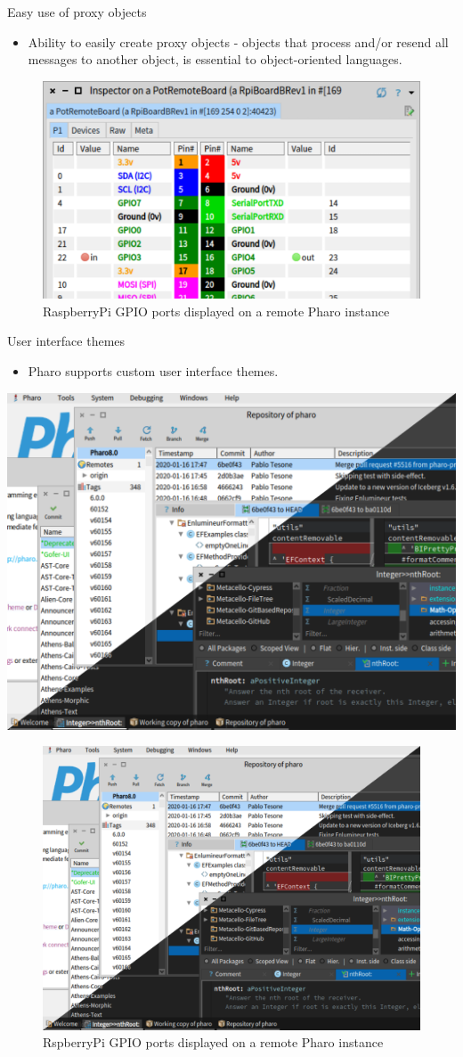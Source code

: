 \documentclass{beamer}
\begin{document}
\begin{frame}{Easy use of proxy objects}
\begin{itemize}
    \item Ability to easily create proxy objects - objects that process and/or resend all messages to another object, is essential to object-oriented languages.
\end{itemize}
\begin{figure}
    \centering
    \includegraphics[width=0.5\linewidth]{iot.png}
    \caption{RaspberryPi GPIO ports displayed on a remote Pharo instance }
    \label{fig:iot}
\end{figure}
\end{frame}

\begin{frame}{User interface themes}
\begin{itemize}
    \item Pharo supports custom user interface themes.
\end{itemize}
\includegraphics[width=0.5\linewidth]{themes.png}
\begin{figure}
    \centering
    \includegraphics[width=0.5\linewidth]{themes.png}
    \caption{RspberryPi GPIO ports displayed on a remote Pharo instance }
    \label{fig:themes}
\end{figure}
\end{frame}
\end{document}
